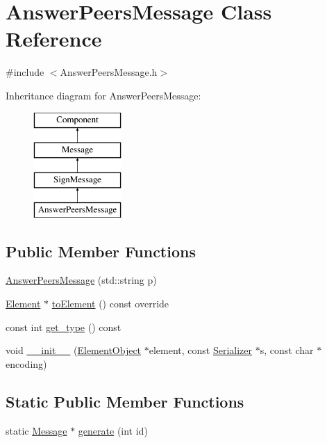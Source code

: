 \hypertarget{classAnswerPeersMessage}{}\section{Answer\+Peers\+Message Class Reference}
\label{classAnswerPeersMessage}


{\ttfamily \#include $<$Answer\+Peers\+Message.\+h$>$}

Inheritance diagram for Answer\+Peers\+Message\+:\begin{figure}[H]
\begin{center}
\leavevmode
\includegraphics[height=4.000000cm]{classAnswerPeersMessage}
\end{center}
\end{figure}
\subsection*{Public Member Functions}
\begin{DoxyCompactItemize}
\item 
\mbox{\hyperlink{classAnswerPeersMessage_a9e187dfc2df64053694b5151db765eee}{Answer\+Peers\+Message}} (std\+::string p)
\item 
\mbox{\hyperlink{classElement}{Element}} $\ast$ \mbox{\hyperlink{classSignMessage_aee897c4bf78df966b8cca95e589566e4}{to\+Element}} () const override
\item 
const int \mbox{\hyperlink{classMessage_a2a576dcffd45c4574fcdf2897ec26086}{get\+\_\+type}} () const
\item 
void \mbox{\hyperlink{classComponent_a28212595f8ee85fe009bd233bc99b2fc}{\+\_\+\+\_\+init\+\_\+\+\_\+}} (\mbox{\hyperlink{classElementObject}{Element\+Object}} $\ast$element, const \mbox{\hyperlink{classSerializer}{Serializer}} $\ast$s, const char $\ast$encoding)
\end{DoxyCompactItemize}
\subsection*{Static Public Member Functions}
\begin{DoxyCompactItemize}
\item 
static \mbox{\hyperlink{classMessage}{Message}} $\ast$ \mbox{\hyperlink{classMessage_ad92a0e1cfa5b5a503ec9c61833e3e5ea}{generate}} (int id)
\end{DoxyCompactItemize}
